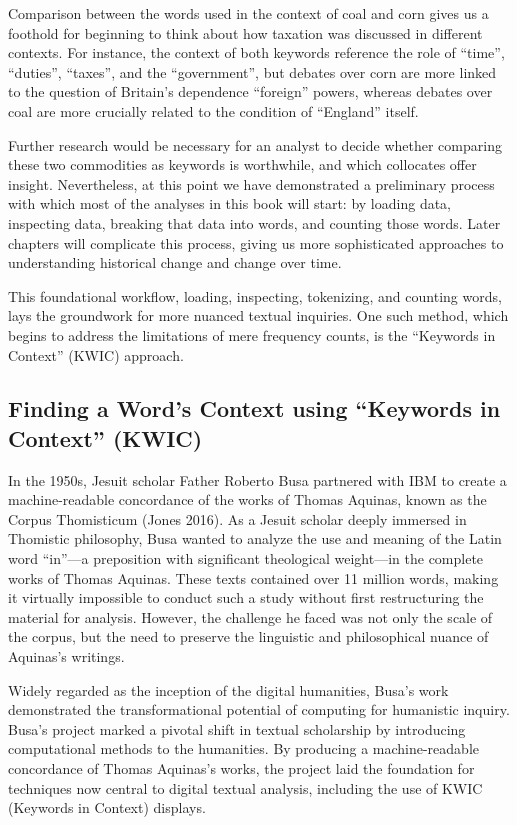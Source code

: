 \documentclass[
]{article}
\begin{document}
Comparison between the words used in the context of coal and corn gives
us a foothold for beginning to think about how taxation was discussed in
different contexts. For instance, the context of both keywords reference
the role of ``time'', ``duties'', ``taxes'', and the ``government'', but
debates over corn are more linked to the question of Britain's
dependence ``foreign'' powers, whereas debates over coal are more
crucially related to the condition of ``England'' itself.

Further research would be necessary for an analyst to decide whether
comparing these two commodities as keywords is worthwhile, and which
collocates offer insight. Nevertheless, at this point we have
demonstrated a preliminary process with which most of the analyses in
this book will start: by loading data, inspecting data, breaking that
data into words, and counting those words. Later chapters will
complicate this process, giving us more sophisticated approaches to
understanding historical change and change over time.

This foundational workflow, loading, inspecting, tokenizing, and
counting words, lays the groundwork for more nuanced textual inquiries.
One such method, which begins to address the limitations of mere
frequency counts, is the ``Keywords in Context'' (KWIC) approach.

\subsection{Finding a Word's Context using ``Keywords in Context''
(KWIC)}\label{finding-a-words-context-using-keywords-in-context-kwic}

In the 1950s, Jesuit scholar Father Roberto Busa partnered with IBM to
create a machine-readable concordance of the works of Thomas Aquinas,
known as the Corpus Thomisticum (Jones 2016). As a Jesuit scholar deeply
immersed in Thomistic philosophy, Busa wanted to analyze the use and
meaning of the Latin word ``in''---a preposition with significant
theological weight---in the complete works of Thomas Aquinas. These
texts contained over 11 million words, making it virtually impossible to
conduct such a study without first restructuring the material for
analysis. However, the challenge he faced was not only the scale of the
corpus, but the need to preserve the linguistic and philosophical nuance
of Aquinas's writings.

Widely regarded as the inception of the digital humanities, Busa's work
demonstrated the transformational potential of computing for humanistic
inquiry. Busa's project marked a pivotal shift in textual scholarship by
introducing computational methods to the humanities. By producing a
machine-readable concordance of Thomas Aquinas's works, the project laid
the foundation for techniques now central to digital textual analysis,
including the use of KWIC (Keywords in Context) displays.
\end{document}
